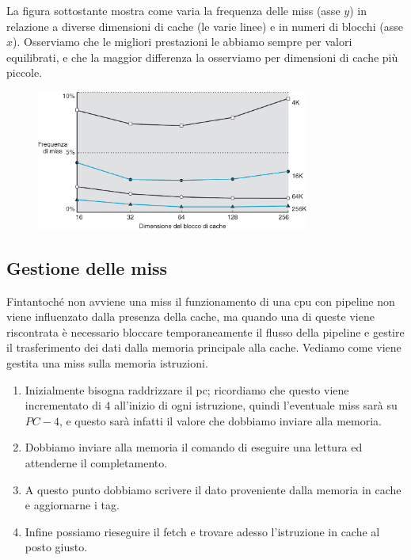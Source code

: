 \documentclass[class=book, crop=false, oneside]{standalone}
\begin{document}
La figura sottostante mostra come varia la frequenza delle miss (asse \(y\)) in relazione a diverse dimensioni di cache (le varie linee) e in numeri di blocchi (asse \(x\)). Osserviamo che le migliori prestazioni le abbiamo sempre per valori equilibrati, e che la maggior differenza la osserviamo per dimensioni di cache più piccole.
\begin{figure}[H]
	\centering
	\includegraphics[width=0.8\textwidth,keepaspectratio]{missfreq.png}
\end{figure}

\subsection{Gestione delle miss}
Fintantoché non avviene una miss il funzionamento di una \acrshort{cpu} con pipeline non viene influenzato dalla presenza della cache, ma quando una di queste viene riscontrata è necessario bloccare temporaneamente il flusso della pipeline e gestire il trasferimento dei dati dalla memoria principale alla cache. Vediamo come viene gestita una miss sulla memoria istruzioni.
\begin{enumerate}
	\item Inizialmente bisogna raddrizzare il \acrshort{pc}; ricordiamo che questo viene incrementato di \(4\) all'inizio di ogni istruzione, quindi l'eventuale miss sarà su \(PC-4\), e questo sarà infatti il valore che dobbiamo inviare alla memoria.
	\item Dobbiamo inviare alla memoria il comando di eseguire una lettura ed attenderne il completamento.
	\item A questo punto dobbiamo scrivere il dato proveniente dalla memoria in cache e aggiornarne i tag.
	\item Infine possiamo rieseguire il fetch e trovare adesso l'istruzione in cache al posto giusto.
\end{enumerate}
\end{document}
